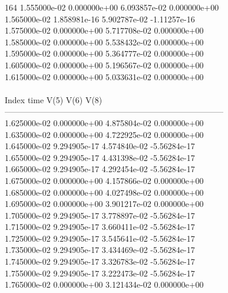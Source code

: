 164	1.555000e-02	0.000000e+00	6.093857e-02	0.000000e+00	\\ 	1.565000e-02	1.858981e-16	5.902787e-02	-1.11257e-16	\\ 	1.575000e-02	0.000000e+00	5.717708e-02	0.000000e+00	\\ 	1.585000e-02	0.000000e+00	5.538432e-02	0.000000e+00	\\ 	1.595000e-02	0.000000e+00	5.364777e-02	0.000000e+00	\\ 	1.605000e-02	0.000000e+00	5.196567e-02	0.000000e+00	\\ 	1.615000e-02	0.000000e+00	5.033631e-02	0.000000e+00	\\ \hline
\\ \hline
Index   time            V(5)            V(6)            V(8)            \\ \hline
--------------------------------------------------------------------------------\\ 	1.625000e-02	0.000000e+00	4.875804e-02	0.000000e+00	\\ 	1.635000e-02	0.000000e+00	4.722925e-02	0.000000e+00	\\ 	1.645000e-02	9.294905e-17	4.574840e-02	-5.56284e-17	\\ 	1.655000e-02	9.294905e-17	4.431398e-02	-5.56284e-17	\\ 	1.665000e-02	9.294905e-17	4.292454e-02	-5.56284e-17	\\ 	1.675000e-02	0.000000e+00	4.157866e-02	0.000000e+00	\\ 	1.685000e-02	0.000000e+00	4.027498e-02	0.000000e+00	\\ 	1.695000e-02	0.000000e+00	3.901217e-02	0.000000e+00	\\ 	1.705000e-02	9.294905e-17	3.778897e-02	-5.56284e-17	\\ 	1.715000e-02	9.294905e-17	3.660411e-02	-5.56284e-17	\\ 	1.725000e-02	9.294905e-17	3.545641e-02	-5.56284e-17	\\ 	1.735000e-02	9.294905e-17	3.434469e-02	-5.56284e-17	\\ 	1.745000e-02	9.294905e-17	3.326783e-02	-5.56284e-17	\\ 	1.755000e-02	9.294905e-17	3.222473e-02	-5.56284e-17	\\ 	1.765000e-02	0.000000e+00	3.121434e-02	0.000000e+00	\\ \hline
